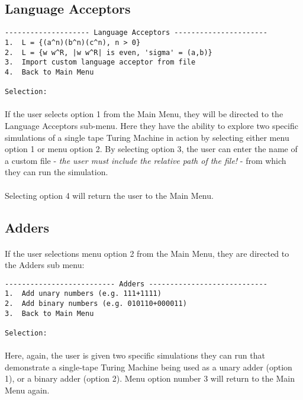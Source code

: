 \documentclass[12pt]{article}
\begin{document}
\subsection{Language Acceptors}
\begin{verbatim}
-------------------- Language Acceptors ----------------------
1.  L = {(a^n)(b^n)(c^n), n > 0}
2.  L = {w w^R, |w w^R| is even, 'sigma' = (a,b)}
3.  Import custom language acceptor from file
4.  Back to Main Menu

Selection:  
\end{verbatim}

\paragraph{}
If the user selects option 1 from the Main Menu, they will be directed to the 
Language Acceptors sub-menu.  Here they have the ability to explore two 
specific simulations of a single tape Turing Machine in action by selecting 
either menu option 1 or menu option 2.  By selecting option 3, the user can 
enter the name of a custom file - \textit{the user must include the relative path of 
the file!} - from which they can run the simulation.

\paragraph{}
Selecting option 4 will return the user to the Main Menu.

\subsection{Adders}
\paragraph{}
If the user selections menu option 2 from the Main Menu, they are directed to 
the Adders sub menu:

\begin{verbatim}
-------------------------- Adders ----------------------------
1.  Add unary numbers (e.g. 111+1111)
2.  Add binary numbers (e.g. 010110+000011)
3.  Back to Main Menu

Selection:      
\end{verbatim}

\paragraph{}
Here, again, the user is given two specific simulations they can run that 
demonstrate a single-tape Turing Machine being used as a unary adder (option 
1), or a binary adder (option 2).  Menu option number 3 will return to the Main 
Menu again.
\end{document}
